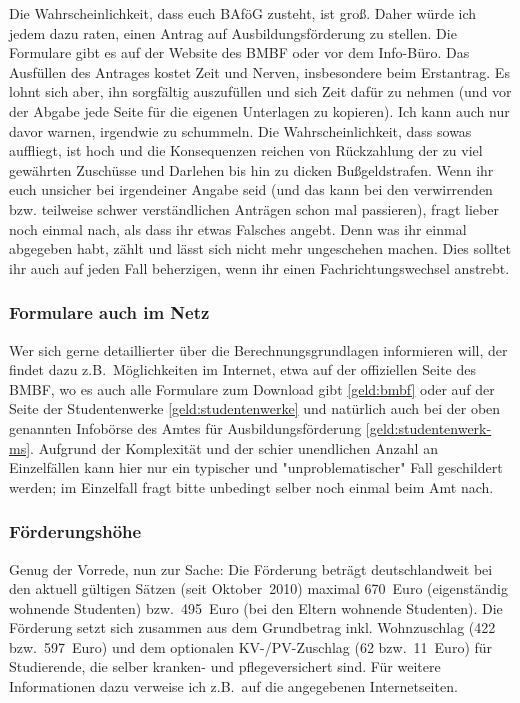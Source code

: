 \begin{multicols*}{2}
Die Wahrscheinlichkeit, dass euch BAföG zusteht, ist groß. Daher würde ich jedem dazu raten, einen Antrag auf Ausbildungsförderung zu stellen. Die Formulare gibt es auf der Website des BMBF oder vor dem Info-Büro. Das Ausfüllen des Antrages kostet Zeit und Nerven, insbesondere beim Erstantrag. Es lohnt sich aber, ihn sorgfältig auszufüllen und sich Zeit dafür zu nehmen (und vor der Abgabe jede Seite für die eigenen Unterlagen zu kopieren). Ich kann auch nur davor warnen, irgendwie zu schummeln. Die Wahrscheinlichkeit, dass sowas auffliegt, ist hoch und die Konsequenzen reichen von Rückzahlung der zu viel gewährten Zuschüsse und Darlehen bis hin zu dicken Bußgeldstrafen. Wenn ihr euch unsicher bei irgendeiner Angabe seid (und das kann bei den verwirrenden bzw. teilweise schwer verständlichen Anträgen schon mal passieren), fragt lieber noch einmal nach, als dass ihr etwas Falsches angebt. Denn was ihr einmal abgegeben habt, zählt und lässt sich nicht mehr ungeschehen machen. Dies solltet ihr auch auf jeden Fall beherzigen, wenn ihr einen Fachrichtungswechsel anstrebt.

\subsubsection*{Formulare auch im Netz}
Wer sich gerne detaillierter über die Berechnungsgrundlagen informieren will, der findet dazu z.B.\ Möglichkeiten im Internet, etwa auf der offiziellen Seite des BMBF, wo es auch alle Formulare zum Download gibt \cref{geld:bmbf} oder auf der Seite der Studentenwerke \cref{geld:studentenwerke} und natürlich auch bei der oben genannten Infobörse des Amtes für Ausbildungsförderung \cref{geld:studentenwerk-ms}. Aufgrund der Komplexität und der schier unendlichen Anzahl an Einzelfällen kann hier nur ein typischer und "unproblematischer" Fall geschildert werden; im Einzelfall fragt bitte unbedingt selber noch einmal beim Amt nach.

\subsubsection*{Förderungshöhe}
Genug der Vorrede, nun zur Sache: Die Förderung beträgt deutschlandweit bei den aktuell gültigen Sätzen (seit Oktober~2010) maximal 670~Euro (eigenständig wohnende Studenten) bzw.\ 495~Euro (bei den Eltern wohnende Studenten). Die Förderung setzt sich zusammen aus dem Grundbetrag inkl. Wohnzuschlag (422 bzw.\ 597~Euro) und dem optionalen KV-/PV-Zuschlag (62 bzw.\ 11~Euro) für Studierende, die selber kranken- und pflegeversichert sind. Für weitere Informationen dazu verweise ich z.B.\ auf die angegebenen Internetseiten.


\end{multicols*}
